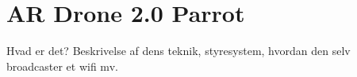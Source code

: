 \section{AR Drone 2.0 Parrot}

Hvad er det? Beskrivelse af dens teknik, styresystem, hvordan den selv broadcaster et wifi mv.
